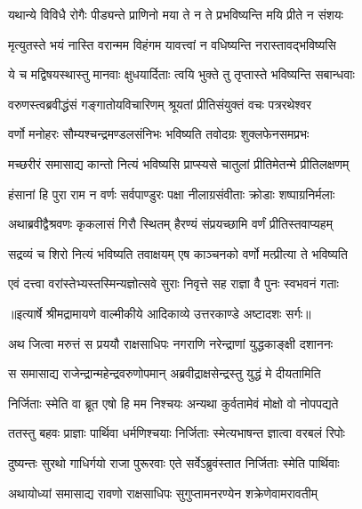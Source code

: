 \twolineshloka
{यथान्ये विविधै रोगैः पीड्यन्ते प्राणिनो मया}
{ते न ते प्रभविष्यन्ति मयि प्रीते न संशयः} %

\twolineshloka
{मृत्युतस्ते भयं नास्ति वरान्मम विहंगम}
{यावत्त्वां न वधिष्यन्ति नरास्तावद्भविष्यसि} %

\twolineshloka
{ये च मद्विषयस्थास्तु मानवाः क्षुधयार्दिताः}
{त्वयि भुक्ते तु तृप्तास्ते भविष्यन्ति सबान्धवाः} %

\twolineshloka
{वरुणस्त्वब्रवीद्धंसं गङ्गातोयविचारिणम्}
{श्रूयतां प्रीतिसंयुक्तं वचः पत्ररथेश्वर} %

\twolineshloka
{वर्णो मनोहरः सौम्यश्चन्द्रमण्डलसंनिभः}
{भविष्यति तवोदग्रः शुक्लफेनसमप्रभः} %

\twolineshloka
{मच्छरीरं समासाद्य कान्तो नित्यं भविष्यसि}
{प्राप्स्यसे चातुलां प्रीतिमेतन्मे प्रीतिलक्षणम्} %

\twolineshloka
{हंसानां हि पुरा राम न वर्णः सर्वपाण्डुरः}
{पक्षा नीलाग्रसंवीताः क्रोडाः शष्पाग्रनिर्मलाः} %

\twolineshloka
{अथाब्रवीद्वैश्रवणः कृकलासं गिरौ स्थितम्}
{हैरण्यं संप्रयच्छामि वर्णं प्रीतिस्तवाप्यहम्} %

\twolineshloka
{सद्रव्यं च शिरो नित्यं भविष्यति तवाक्षयम्}
{एष काञ्चनको वर्णो मत्प्रीत्या ते भविष्यति} %

\twolineshloka
{एवं दत्त्वा वरांस्तेभ्यस्तस्मिन्यज्ञोत्सवे सुराः}
{निवृत्ते सह राज्ञा वै पुनः स्वभवनं गताः} %


{॥इत्यार्षे श्रीमद्रामायणे वाल्मीकीये आदिकाव्ये उत्तरकाण्डे अष्टादशः सर्गः॥}


\twolineshloka
{अथ जित्वा मरुत्तं स प्रययौ राक्षसाधिपः}
{नगराणि नरेन्द्राणां युद्धकाङ्क्षी दशाननः} %

\twolineshloka
{स समासाद्य राजेन्द्रान्महेन्द्रवरुणोपमान्}
{अब्रवीद्राक्षसेन्द्रस्तु युद्धं मे दीयतामिति} %

\twolineshloka
{निर्जिताः स्मेति वा ब्रूत एषो हि मम निश्चयः}
{अन्यथा कुर्वतामेवं मोक्षो वो नोपपद्यते} %

\twolineshloka
{ततस्तु बहवः प्राज्ञाः पार्थिवा धर्मणिश्चयाः}
{निर्जिताः स्मेत्यभाषन्त ज्ञात्वा वरबलं रिपोः} %

\twolineshloka
{दुष्यन्तः सुरथो गाधिर्गयो राजा पुरूरवाः}
{एते सर्वेऽब्रुवंस्तात निर्जिताः स्मेति पार्थिवाः} %

\twolineshloka
{अथायोध्यां समासाद्य रावणो राक्षसाधिपः}
{सुगुप्तामनरण्येन शक्रेणेवामरावतीम्} %

